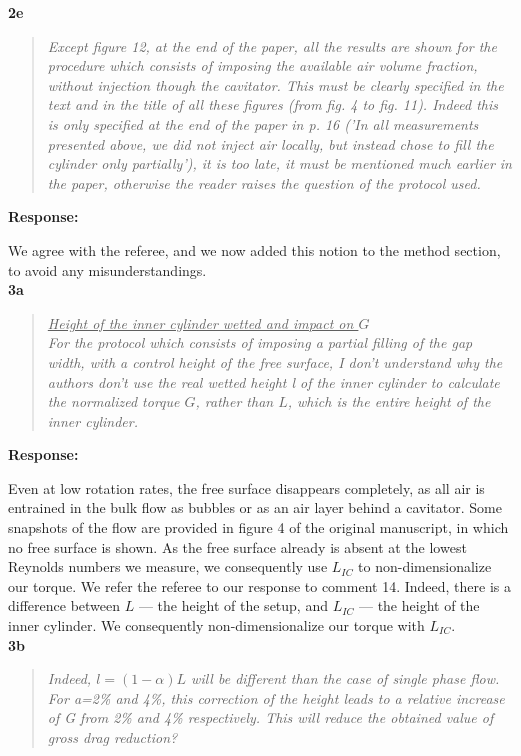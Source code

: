 \documentclass[10pt]{article}
\newcommand{\strong}[1]{\textbf{#1}}
\newcommand{\question}[1]{\begin{quote} \emph{#1}  \end{quote} }
\begin{document}
\noindent \strong{2e}

\question{Except figure 12, at the end of the paper, all the results are shown for the procedure which consists of imposing the available air volume fraction, without injection though the cavitator. This must be clearly specified in the text and in the title of all these figures (from fig. 4 to fig. 11). Indeed this is only specified at the end of the paper in p. 16 ('In all measurements presented above, we did not inject air locally, but instead chose to fill the cylinder only partially'), it is too late, it must be mentioned much earlier in the paper, otherwise the reader raises the question of the protocol used.
 }

\noindent \strong{Response:} 

\noindent We agree with the referee, and we now added this notion to the method section, to avoid any misunderstandings.\\

\noindent \strong{3a}

\question{\underline{Height of the inner cylinder wetted and impact on $G$} \\
For the protocol which consists of imposing a partial filling of the gap width, with a control height of the free surface, I don't understand why the authors don't use the real wetted height l of the inner cylinder to calculate the normalized torque $G$, rather than $L$, which is the entire height of the inner cylinder. }

\noindent \strong{Response:} 

\noindent Even at low rotation rates, the free surface disappears completely, as all air is entrained in the bulk flow as bubbles or as an air layer behind a cavitator. Some snapshots of the flow are provided in figure 4 of the original manuscript, in which no free surface is shown. As the free surface already is absent at the lowest Reynolds numbers we measure, we consequently use $L_{IC}$ to non-dimensionalize our torque. We refer the referee to our response to comment 14. Indeed, there is a difference between $L$ --- the height of the setup, and $L_{IC}$ --- the height of the inner cylinder. We consequently non-dimensionalize our torque with $L_{IC}$.\\

\noindent \strong{3b}

\question{Indeed, $l=(1-\alpha)L$ will be different than the case of single phase flow. For a=2\% and 4\%, this correction of the height leads to a relative increase of G from 2\% and 4\% respectively. This will reduce the obtained value of gross drag reduction?
 }
\end{document}
